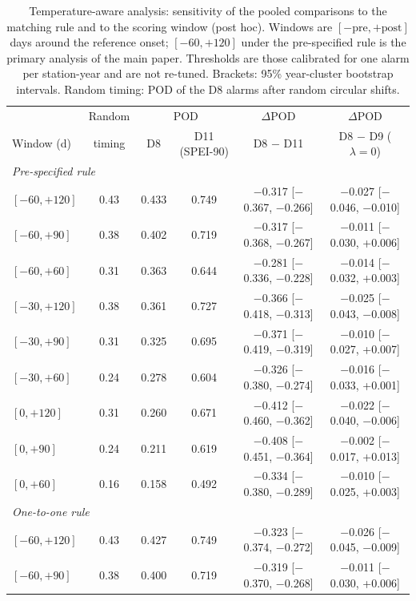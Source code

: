 \begin{table}[tbp]
\caption{Temperature-aware analysis: sensitivity of the pooled comparisons to the matching rule and to the
scoring window (post hoc). Windows are $[-\text{pre},+\text{post}]$ days around the reference onset; $[-60,+120]$ under the pre-specified rule is the primary analysis of the main paper. Thresholds are those calibrated for one alarm per station-year and are not re-tuned. Brackets: 95\% year-cluster bootstrap intervals. Random timing: POD of the D8 alarms after random circular
shifts.}
\label{tab:matchingmv}
\footnotesize\setlength{\tabcolsep}{3pt}
\begin{tabular*}{\textwidth}{@{\extracolsep\fill}lccccc}
\toprule
& Random & \multicolumn{2}{c}{POD} & $\Delta$POD & $\Delta$POD\\
Window (d) & timing & D8 & D11 (SPEI-90) & D8 $-$ D11 & D8 $-$ D9 ($\lambda=0$)\\
\midrule
\multicolumn{6}{l}{\textit{Pre-specified rule}}\\
$[{-}60,+120]$ & 0.43 & 0.433 & 0.749 & $-$0.317 [$-$0.367, $-$0.266] & $-$0.027 [$-$0.046, $-$0.010] \\
$[{-}60,+90]$ & 0.38 & 0.402 & 0.719 & $-$0.317 [$-$0.368, $-$0.267] & $-$0.011 [$-$0.030, +0.006] \\
$[{-}60,+60]$ & 0.31 & 0.363 & 0.644 & $-$0.281 [$-$0.336, $-$0.228] & $-$0.014 [$-$0.032, +0.003] \\
$[{-}30,+120]$ & 0.38 & 0.361 & 0.727 & $-$0.366 [$-$0.418, $-$0.313] & $-$0.025 [$-$0.043, $-$0.008] \\
$[{-}30,+90]$ & 0.31 & 0.325 & 0.695 & $-$0.371 [$-$0.419, $-$0.319] & $-$0.010 [$-$0.027, +0.007] \\
$[{-}30,+60]$ & 0.24 & 0.278 & 0.604 & $-$0.326 [$-$0.380, $-$0.274] & $-$0.016 [$-$0.033, +0.001] \\
$[0,+120]$ & 0.31 & 0.260 & 0.671 & $-$0.412 [$-$0.460, $-$0.362] & $-$0.022 [$-$0.040, $-$0.006] \\
$[0,+90]$ & 0.24 & 0.211 & 0.619 & $-$0.408 [$-$0.451, $-$0.364] & $-$0.002 [$-$0.017, +0.013] \\
$[0,+60]$ & 0.16 & 0.158 & 0.492 & $-$0.334 [$-$0.380, $-$0.289] & $-$0.010 [$-$0.025, +0.003] \\
\midrule
\multicolumn{6}{l}{\textit{One-to-one rule}}\\
$[{-}60,+120]$ & 0.43 & 0.427 & 0.749 & $-$0.323 [$-$0.374, $-$0.272] & $-$0.026 [$-$0.045, $-$0.009] \\
$[{-}60,+90]$ & 0.38 & 0.400 & 0.719 & $-$0.319 [$-$0.370, $-$0.268] & $-$0.011 [$-$0.030, +0.006] \\

\end{tabular*}
\end{table}
